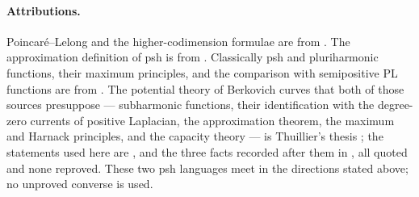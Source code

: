 \paragraph{Attributions.}
Poincar\'e--Lelong and the higher-codimension formulae are from
\cite[\S16.7 and \S18.7]{CLD25}.  The approximation definition of psh is
from \cite[Chapter~8]{CLD25}.  Classically psh and pluriharmonic functions,
their maximum principles, and the comparison with semipositive PL functions
are from \cite{GR25Classical,GR25PL}.  The potential theory of Berkovich
curves that both of those sources presuppose --- subharmonic functions,
their identification with the degree-zero currents of positive Laplacian,
the approximation theorem, the maximum and Harnack principles, and the
capacity theory --- is Thuillier's thesis \cite{Thu05}; the statements used
here are ,
 and the three facts recorded after
them in , all quoted and none reproved.
These two psh languages meet in the
directions stated above; no unproved converse is used.

